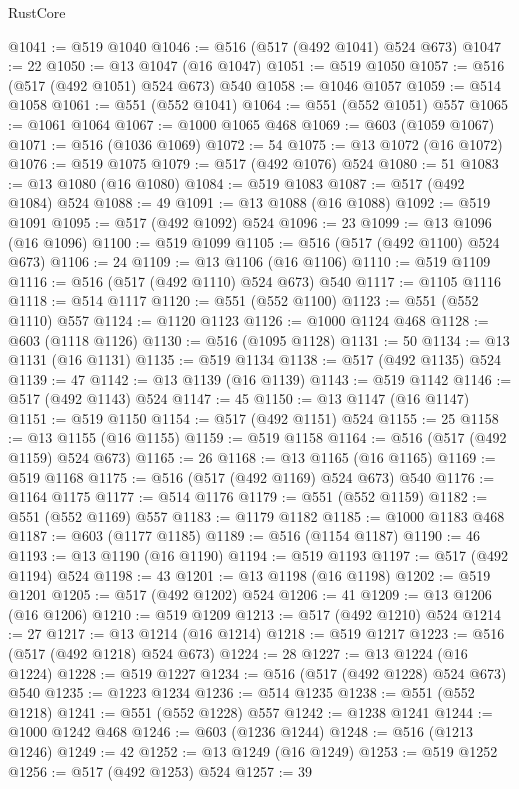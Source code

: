 \begin{lexlean}{RustCore}
\begin{coremodule}
@1041 := @519 @1040
@1046 := @516 (@517 (@492 @1041) @524 @673)
@1047 := 22
@1050 := @13 @1047 (@16 @1047)
@1051 := @519 @1050
@1057 := @516 (@517 (@492 @1051) @524 @673) @540
@1058 := @1046 @1057
@1059 := @514 @1058
@1061 := @551 (@552 @1041)
@1064 := @551 (@552 @1051) @557
@1065 := @1061 @1064
@1067 := @1000 @1065 @468
@1069 := @603 (@1059 @1067)
@1071 := @516 (@1036 @1069)
@1072 := 54
@1075 := @13 @1072 (@16 @1072)
@1076 := @519 @1075
@1079 := @517 (@492 @1076) @524
@1080 := 51
@1083 := @13 @1080 (@16 @1080)
@1084 := @519 @1083
@1087 := @517 (@492 @1084) @524
@1088 := 49
@1091 := @13 @1088 (@16 @1088)
@1092 := @519 @1091
@1095 := @517 (@492 @1092) @524
@1096 := 23
@1099 := @13 @1096 (@16 @1096)
@1100 := @519 @1099
@1105 := @516 (@517 (@492 @1100) @524 @673)
@1106 := 24
@1109 := @13 @1106 (@16 @1106)
@1110 := @519 @1109
@1116 := @516 (@517 (@492 @1110) @524 @673) @540
@1117 := @1105 @1116
@1118 := @514 @1117
@1120 := @551 (@552 @1100)
@1123 := @551 (@552 @1110) @557
@1124 := @1120 @1123
@1126 := @1000 @1124 @468
@1128 := @603 (@1118 @1126)
@1130 := @516 (@1095 @1128)
@1131 := 50
@1134 := @13 @1131 (@16 @1131)
@1135 := @519 @1134
@1138 := @517 (@492 @1135) @524
@1139 := 47
@1142 := @13 @1139 (@16 @1139)
@1143 := @519 @1142
@1146 := @517 (@492 @1143) @524
@1147 := 45
@1150 := @13 @1147 (@16 @1147)
@1151 := @519 @1150
@1154 := @517 (@492 @1151) @524
@1155 := 25
@1158 := @13 @1155 (@16 @1155)
@1159 := @519 @1158
@1164 := @516 (@517 (@492 @1159) @524 @673)
@1165 := 26
@1168 := @13 @1165 (@16 @1165)
@1169 := @519 @1168
@1175 := @516 (@517 (@492 @1169) @524 @673) @540
@1176 := @1164 @1175
@1177 := @514 @1176
@1179 := @551 (@552 @1159)
@1182 := @551 (@552 @1169) @557
@1183 := @1179 @1182
@1185 := @1000 @1183 @468
@1187 := @603 (@1177 @1185)
@1189 := @516 (@1154 @1187)
@1190 := 46
@1193 := @13 @1190 (@16 @1190)
@1194 := @519 @1193
@1197 := @517 (@492 @1194) @524
@1198 := 43
@1201 := @13 @1198 (@16 @1198)
@1202 := @519 @1201
@1205 := @517 (@492 @1202) @524
@1206 := 41
@1209 := @13 @1206 (@16 @1206)
@1210 := @519 @1209
@1213 := @517 (@492 @1210) @524
@1214 := 27
@1217 := @13 @1214 (@16 @1214)
@1218 := @519 @1217
@1223 := @516 (@517 (@492 @1218) @524 @673)
@1224 := 28
@1227 := @13 @1224 (@16 @1224)
@1228 := @519 @1227
@1234 := @516 (@517 (@492 @1228) @524 @673) @540
@1235 := @1223 @1234
@1236 := @514 @1235
@1238 := @551 (@552 @1218)
@1241 := @551 (@552 @1228) @557
@1242 := @1238 @1241
@1244 := @1000 @1242 @468
@1246 := @603 (@1236 @1244)
@1248 := @516 (@1213 @1246)
@1249 := 42
@1252 := @13 @1249 (@16 @1249)
@1253 := @519 @1252
@1256 := @517 (@492 @1253) @524
@1257 := 39

\end{coremodule}
\end{lexlean}
